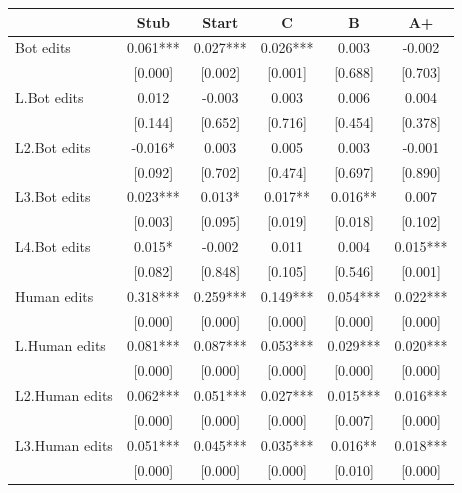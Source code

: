 {
\def\sym#1{\ifmmode^{#1}\else\(^{#1}\)\fi}
\begin{tabular}{l*{5}{c}}
\toprule
                    &\multicolumn{1}{c}{Stub}&\multicolumn{1}{c}{Start}&\multicolumn{1}{c}{C}&\multicolumn{1}{c}{B}&\multicolumn{1}{c}{A+}\\
\midrule
Bot edits           &     0.061***&     0.027***&     0.026***&     0.003   &    -0.002   \\
                    &   [0.000]   &   [0.002]   &   [0.001]   &   [0.688]   &   [0.703]   \\
L.Bot edits         &     0.012   &    -0.003   &     0.003   &     0.006   &     0.004   \\
                    &   [0.144]   &   [0.652]   &   [0.716]   &   [0.454]   &   [0.378]   \\
L2.Bot edits        &    -0.016*  &     0.003   &     0.005   &     0.003   &    -0.001   \\
                    &   [0.092]   &   [0.702]   &   [0.474]   &   [0.697]   &   [0.890]   \\
L3.Bot edits        &     0.023***&     0.013*  &     0.017** &     0.016** &     0.007   \\
                    &   [0.003]   &   [0.095]   &   [0.019]   &   [0.018]   &   [0.102]   \\
L4.Bot edits        &     0.015*  &    -0.002   &     0.011   &     0.004   &     0.015***\\
                    &   [0.082]   &   [0.848]   &   [0.105]   &   [0.546]   &   [0.001]   \\
Human edits         &     0.318***&     0.259***&     0.149***&     0.054***&     0.022***\\
                    &   [0.000]   &   [0.000]   &   [0.000]   &   [0.000]   &   [0.000]   \\
L.Human edits       &     0.081***&     0.087***&     0.053***&     0.029***&     0.020***\\
                    &   [0.000]   &   [0.000]   &   [0.000]   &   [0.000]   &   [0.000]   \\
L2.Human edits      &     0.062***&     0.051***&     0.027***&     0.015***&     0.016***\\
                    &   [0.000]   &   [0.000]   &   [0.000]   &   [0.007]   &   [0.000]   \\
L3.Human edits      &     0.051***&     0.045***&     0.035***&     0.016** &     0.018***\\
                    &   [0.000]   &   [0.000]   &   [0.000]   &   [0.010]   &   [0.000]   \\

\end{tabular}}
